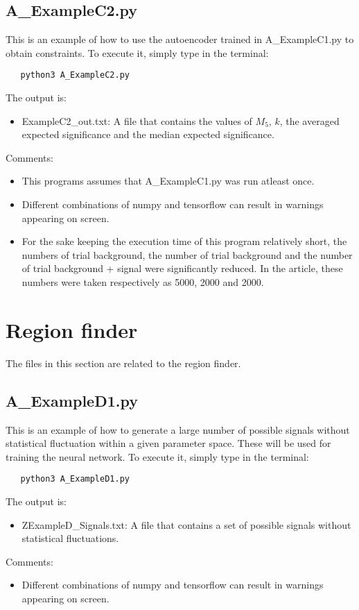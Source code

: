 \documentclass{article}
\begin{document}
\subsection{A\_ExampleC2.py}
This is an example of how to use the autoencoder trained in A\_ExampleC1.py to obtain constraints. To execute it, simply type in the terminal:
\begin{verbatim}
   python3 A_ExampleC2.py
\end{verbatim}
The output is:
\begin{itemize}
  \item ExampleC2\_out.txt: A file that contains the values of $M_5$, $k$, the averaged expected significance and the median expected significance.
\end{itemize}
Comments:
\begin{itemize}
  \item This programs assumes that A\_ExampleC1.py was run atleast once.
  \item Different combinations of numpy and tensorflow can result in warnings appearing on screen.
  \item For the sake keeping the execution time of this program relatively short, the numbers of trial background, the number of trial background and the number of trial background + signal were significantly reduced. In the article, these numbers were taken respectively as 5000, 2000 and 2000.
\end{itemize}

\pagebreak

\section{Region finder}
The files in this section are related to the region finder.

\subsection{A\_ExampleD1.py}
This is an example of how to generate a large number of possible signals without statistical fluctuation within a given parameter space. These will be used for training the neural network. To execute it, simply type in the terminal:
\begin{verbatim}
   python3 A_ExampleD1.py
\end{verbatim}
The output is:
\begin{itemize}
  \item ZExampleD\_Signals.txt: A file that contains a set of possible signals without statistical fluctuations.
\end{itemize}
Comments:
\begin{itemize}
  \item Different combinations of numpy and tensorflow can result in warnings appearing on screen.
\end{itemize}
\end{document}
